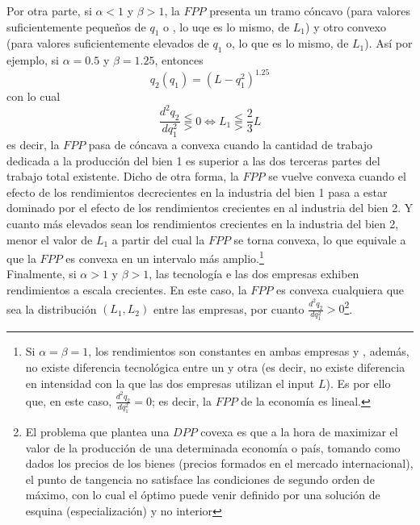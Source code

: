 \begin{enumerate}[a)]
	Por otra parte, si $\alpha < 1$ y $\beta > 1$, la $FPP$ presenta un tramo cóncavo (para valores suficientemente pequeños de $q_1$ o , lo uqe es lo mismo, de $L_1$) y otro convexo (para valores suficientemente elevados de $q_1$ o, lo que es lo mismo, de $L_1$). Así por ejemplo, si $\alpha = 0.5$ y $\beta =  1.25$, entonces
			$$q_2(q_1) = \left( L - q_{1}^{2}\right)^{1.25}$$
	con lo cual
			$$\frac{d^2q_2}{dq_{1}^2} \lesseqqgtr 0 \Leftrightarrow L_1 \lesseqqgtr \frac{2}{3}L$$
	es decir, la $FPP$ pasa de cóncava a convexa cuando la cantidad de trabajo dedicada a la producción del bien 1 es superior a las dos terceras partes del trabajo total existente. Dicho de otra forma, la $FPP$ se vuelve convexa cuando el efecto de los rendimientos decrecientes en la industria del bien 1 pasa a estar dominado por el efecto de los rendimientos crecientes en al industria del bien 2. Y cuanto más elevados sean los rendimientos crecientes en la industria del bien 2, menor el valor de $L_1$ a partir del cual la $FPP$ se torna convexa, lo que equivale a que la $FPP$ es convexa en un intervalo más amplio.\footnote{Si $\alpha = \beta = 1$, los rendimientos son constantes en ambas empresas y , además, no existe diferencia tecnológica entre un y otra (es decir, no existe diferencia en intensidad con la que las dos empresas utilizan el input $L$). Es por ello que, en este caso, $\frac{d^2q_2}{dq_{1}^2} = 0$; es decir, la $FPP$ de la economía es lineal.}\\
	
	Finalmente, si $\alpha > 1$ y $\beta > 1$, las tecnología e las dos empresas exhiben rendimientos a escala crecientes. En este caso, la $FPP$ es convexa cualquiera que sea la distribución $(L_1,L_2)$ entre las empresas, por cuanto $\frac{d^2q_2}{dq_{1}^2} > 0$\footnote{El problema que plantea una $DPP$ covexa es que a la hora de maximizar el valor de la producción de una determinada economía o país, tomando como dados los precios de los bienes (precios formados en el mercado internacional), el punto de tangencia no satisface las condiciones de segundo orden de máximo, con lo cual el óptimo puede venir definido por una solución de esquina (especialización) y no interior}.
\end{enumerate}